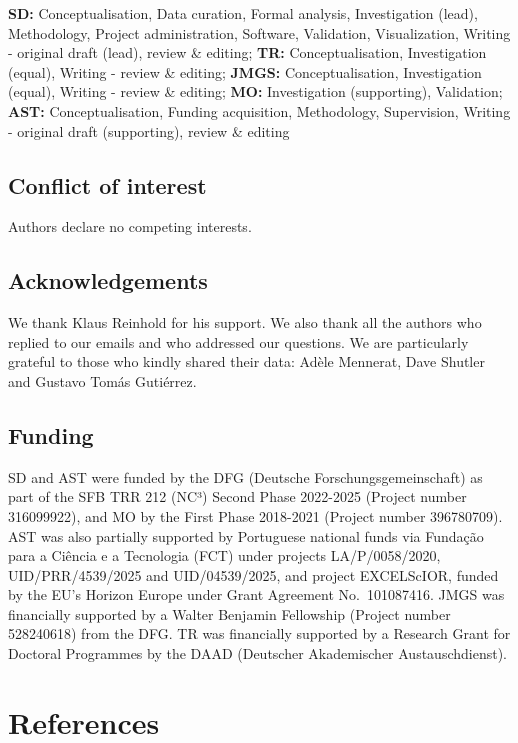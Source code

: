 \documentclass[
  number,
  review,
  onecolumn]{elsarticle}
\begin{document}
\textbf{SD:} Conceptualisation, Data curation, Formal analysis,
Investigation (lead), Methodology, Project administration, Software,
Validation, Visualization, Writing - original draft (lead), review \&
editing; \textbf{TR:} Conceptualisation, Investigation (equal), Writing
- review \& editing; \textbf{JMGS:} Conceptualisation, Investigation
(equal), Writing - review \& editing; \textbf{MO:} Investigation
(supporting), Validation; \textbf{AST:} Conceptualisation, Funding
acquisition, Methodology, Supervision, Writing - original draft
(supporting), review \& editing

\subsection{Conflict of interest}\label{conflict-of-interest}

Authors declare no competing interests.

\subsection{Acknowledgements}\label{acknowledgements}

We thank Klaus Reinhold for his support. We also thank all the authors
who replied to our emails and who addressed our questions. We are
particularly grateful to those who kindly shared their data: Adèle
Mennerat, Dave Shutler and Gustavo Tomás Gutiérrez.

\subsection{Funding}\label{funding}

SD and AST were funded by the DFG (Deutsche Forschungsgemeinschaft) as
part of the SFB TRR 212 (NC³) Second Phase 2022-2025 (Project number
316099922), and MO by the First Phase 2018-2021 (Project number
396780709). AST was also partially supported by Portuguese national
funds via Fundação para a Ciência e a Tecnologia (FCT) under projects
LA/P/0058/2020, UID/PRR/4539/2025 and UID/04539/2025, and project
EXCELScIOR, funded by the EU's Horizon Europe under Grant Agreement
No.~101087416. JMGS was financially supported by a Walter Benjamin
Fellowship (Project number 528240618) from the DFG. TR was financially
supported by a Research Grant for Doctoral Programmes by the DAAD
(Deutscher Akademischer Austauschdienst).

\section{References}\label{references}
\end{document}
